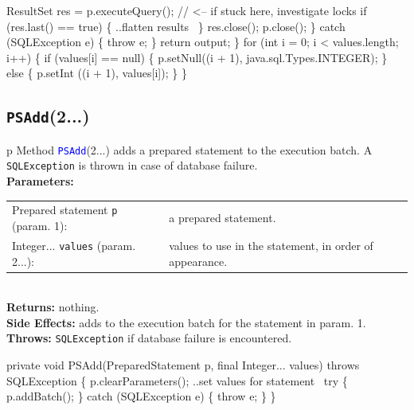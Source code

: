 \documentclass{article}
\def\nwendcode{\endtrivlist \endgroup}      %
\let\nwdocspar=\par
\theoremstyle{definition}                   %
\begin{document}
    ResultSet res = p.executeQuery();  // <-- if stuck here, investigate locks
    if (res.last() == true) \{
      \LA{}..flatten results~{\nwtagstyle{}}\RA{}
    \}
    res.close();
    p.close();
  \} catch (SQLException e) \{
    throw e;
  \}
  return output;
\}
\eatline
{}\nwendcode{}\endmoddef{}
for (int i = 0; i < values.length; i++) \{
  if (values[i] == null) \{
    p.setNull((i + 1), java.sql.Types.INTEGER);
  \} else \{
    p.setInt ((i + 1), values[i]);
  \}
\}
\nwendcode{}\nwdocspar

\subsection{{\tt{}\protect{}PSAdd}(2...)}
\begin{tabular}{p{\textwidth}}
\toprule
{}
Method \textcolor{blue}{{\tt{}\protect{}PSAdd}}(2...) adds a prepared statement to
the execution batch.
A {\tt{}SQLException} is thrown in case of database failure.\\
\midrule
\textbf{Parameters:} \\
\begin{tabular}{lp{116mm}}
Prepared statement {\tt{}p} (param. 1):&a prepared statement.\\
Integer... {\tt{}values} (param. 2...):&values to use in the statement, in order of appearance.\\
\end{tabular}\\
\textbf{Returns:} nothing.\\
\textbf{Side Effects:} adds to the execution batch for the statement in param. 1.\\
\textbf{Throws:} {\tt{}SQLException} if database failure is encountered.\\
\bottomrule
\end{tabular}
\nwenddocs{}\endmoddef{}
private void PSAdd(PreparedStatement p, final Integer... values) throws SQLException \{
  p.clearParameters();
  \LA{}..set values for statement~{\nwtagstyle{}}\RA{}
  try \{
    p.addBatch();
  \} catch (SQLException e) \{
    throw e;
  \}
\}
\eatline
{}\nwendcode{}\nwdocspar
\end{document}
